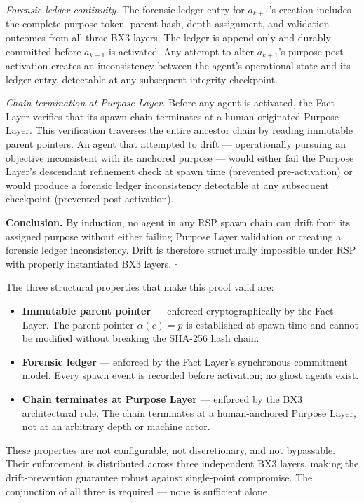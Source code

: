 \begin{Proof}
\textit{Forensic ledger continuity.} The forensic ledger entry for $a_{k+1}$'s creation includes the complete purpose token, parent hash, depth assignment, and validation outcomes from all three BX3 layers. The ledger is append-only and durably committed before $a_{k+1}$ is activated. Any attempt to alter $a_{k+1}$'s purpose post-activation creates an inconsistency between the agent's operational state and its ledger entry, detectable at any subsequent integrity checkpoint.

\textit{Chain termination at Purpose Layer.} Before any agent is activated, the Fact Layer verifies that its spawn chain terminates at a human-originated Purpose Layer. This verification traverses the entire ancestor chain by reading immutable parent pointers. An agent that attempted to drift --- operationally pursuing an objective inconsistent with its anchored purpose --- would either fail the Purpose Layer's descendant refinement check at spawn time (prevented pre-activation) or would produce a forensic ledger inconsistency detectable at any subsequent checkpoint (prevented post-activation).

\medskip
\noindent\textbf{Conclusion.} By induction, no agent in any RSP spawn chain can drift from its assigned purpose without either failing Purpose Layer validation or creating a forensic ledger inconsistency. Drift is therefore structurally impossible under RSP with properly instantiated BX3 layers. $\square$
\end{Proof}

The three structural properties that make this proof valid are:

\begin{itemize}
  \item \textbf{Immutable parent pointer} --- enforced cryptographically by the Fact Layer. The parent pointer $\alpha(c) = p$ is established at spawn time and cannot be modified without breaking the SHA-256 hash chain.
  \item \textbf{Forensic ledger} --- enforced by the Fact Layer's synchronous commitment model. Every spawn event is recorded before activation; no ghost agents exist.
  \item \textbf{Chain terminates at Purpose Layer} --- enforced by the BX3 architectural rule. The chain terminates at a human-anchored Purpose Layer, not at an arbitrary depth or machine actor.
\end{itemize}

These properties are not configurable, not discretionary, and not bypassable. Their enforcement is distributed across three independent BX3 layers, making the drift-prevention guarantee robust against single-point compromise. The conjunction of all three is required --- none is sufficient alone.

